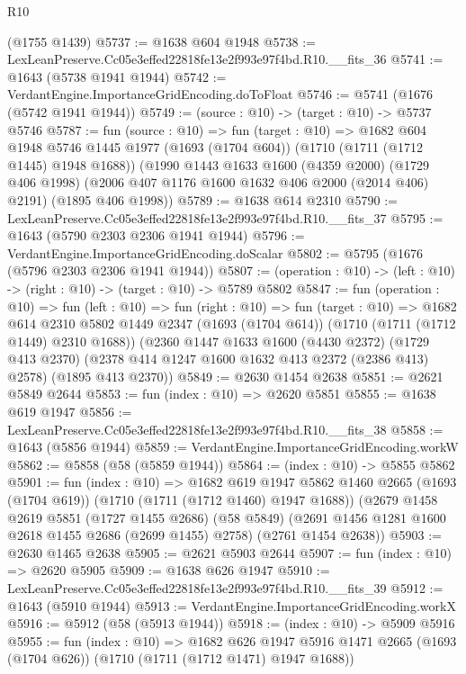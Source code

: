 \begin{lexlean}{R10}
\begin{coremodule}
    (@1755 @1439)
@5737 := @1638 @604 @1948
@5738 := LexLeanPreserve.Cc05e3effed22818fe13e2f993e97f4bd.R10.__fits_36
@5741 := @1643 (@5738 @1941 @1944)
@5742 := VerdantEngine.ImportanceGridEncoding.doToFloat
@5746 := @5741 (@1676 (@5742 @1941 @1944))
@5749 := (source : @10) -> (target : @10) -> @5737 @5746
@5787 := fun (source : @10) =>
  fun (target : @10) =>
  @1682
    @604
    @1948
    @5746
    @1445
    @1977
    (@1693 (@1704 @604))
    (@1710 (@1711 (@1712 @1445) @1948 @1688))
    (@1990
      @1443
      @1633
      @1600
      (@4359 @2000)
      (@1729 @406 @1998)
      (@2006 @407 @1176 @1600 @1632 @406 @2000 (@2014 @406) @2191)
      (@1895 @406 @1998))
@5789 := @1638 @614 @2310
@5790 := LexLeanPreserve.Cc05e3effed22818fe13e2f993e97f4bd.R10.__fits_37
@5795 := @1643 (@5790 @2303 @2306 @1941 @1944)
@5796 := VerdantEngine.ImportanceGridEncoding.doScalar
@5802 := @5795 (@1676 (@5796 @2303 @2306 @1941 @1944))
@5807 := (operation : @10) -> (left : @10) -> (right : @10) -> (target : @10) -> @5789 @5802
@5847 := fun (operation : @10) =>
  fun (left : @10) =>
  fun (right : @10) =>
  fun (target : @10) =>
  @1682
    @614
    @2310
    @5802
    @1449
    @2347
    (@1693 (@1704 @614))
    (@1710 (@1711 (@1712 @1449) @2310 @1688))
    (@2360
      @1447
      @1633
      @1600
      (@4430 @2372)
      (@1729 @413 @2370)
      (@2378 @414 @1247 @1600 @1632 @413 @2372 (@2386 @413) @2578)
      (@1895 @413 @2370))
@5849 := @2630 @1454 @2638
@5851 := @2621 @5849 @2644
@5853 := fun (index : @10) => @2620 @5851
@5855 := @1638 @619 @1947
@5856 := LexLeanPreserve.Cc05e3effed22818fe13e2f993e97f4bd.R10.__fits_38
@5858 := @1643 (@5856 @1944)
@5859 := VerdantEngine.ImportanceGridEncoding.workW
@5862 := @5858 (@58 (@5859 @1944))
@5864 := (index : @10) -> @5855 @5862
@5901 := fun (index : @10) =>
  @1682
    @619
    @1947
    @5862
    @1460
    @2665
    (@1693 (@1704 @619))
    (@1710 (@1711 (@1712 @1460) @1947 @1688))
    (@2679
      @1458
      @2619
      @5851
      (@1727 @1455 @2686)
      (@58 @5849)
      (@2691 @1456 @1281 @1600 @2618 @1455 @2686 (@2699 @1455) @2758)
      (@2761 @1454 @2638))
@5903 := @2630 @1465 @2638
@5905 := @2621 @5903 @2644
@5907 := fun (index : @10) => @2620 @5905
@5909 := @1638 @626 @1947
@5910 := LexLeanPreserve.Cc05e3effed22818fe13e2f993e97f4bd.R10.__fits_39
@5912 := @1643 (@5910 @1944)
@5913 := VerdantEngine.ImportanceGridEncoding.workX
@5916 := @5912 (@58 (@5913 @1944))
@5918 := (index : @10) -> @5909 @5916
@5955 := fun (index : @10) =>
  @1682
    @626
    @1947
    @5916
    @1471
    @2665
    (@1693 (@1704 @626))
    (@1710 (@1711 (@1712 @1471) @1947 @1688))

\end{coremodule}
\end{lexlean}
